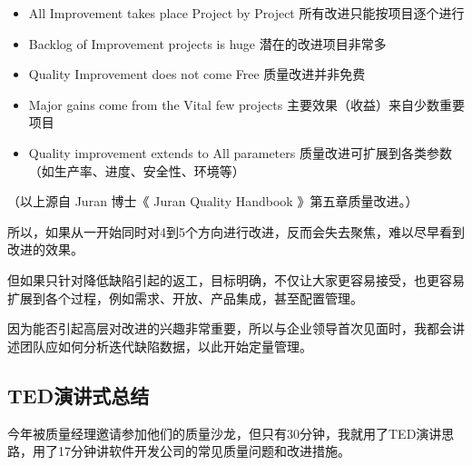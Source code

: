 \begin{itemize}
\tightlist
\item
  All Improvement takes place Project by Project
  所有改进只能按项目逐个进行
\item
  Backlog of Improvement projects is huge 潜在的改进项目非常多
\item
  Quality Improvement does not come Free 质量改进并非免费
\item
  Major gains come from the Vital few projects
  主要效果（收益）来自少数重要项目
\item
  Quality improvement extends to All parameters 质量改进可扩展到各类参数
  （如生产率、进度、安全性、环境等）
\end{itemize}

（以上源自 Juran 博士《 Juran Quality Handbook 》第五章质量改进。） 

所以，如果从一开始同时对4到5个方向进行改进，反而会失去聚焦，难以尽早看到改进的效果。 

但如果只针对降低缺陷引起的返工，目标明确，不仅让大家更容易接受，也更容易扩展到各个过程，例如需求、开放、产品集成，甚至配置管理。 

因为能否引起高层对改进的兴趣非常重要，所以与企业领导首次见面时，我都会讲述团队应如何分析迭代缺陷数据，以此开始定量管理。


\hypertarget{tedux6f14ux8bb2ux5f0fux603bux7ed3}{%
\subsection{TED演讲式总结}\label{tedux6f14ux8bb2ux5f0fux603bux7ed3}}

今年被质量经理邀请参加他们的质量沙龙，但只有30分钟，我就用了TED演讲思路，用了17分钟讲软件开发公司的常见质量问题和改进措施。

